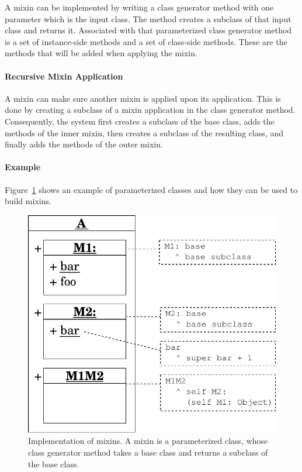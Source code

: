 A mixin can be implemented by writing a class generator method with one parameter which is the input class. The method creates a subclass of that input class and returns it. Associated with that parameterized class generator method is a set of instance-side methods and a set of class-side methods. These are the methods that will be added when applying the mixin.

\paragraph{Recursive Mixin Application}
A mixin can make sure another mixin is applied upon its application. This is done by creating a subclass of a mixin application in the class generator method. Consequently, the system first creates a subclass of the base class, adds the methods of the inner mixin, then creates a subclass of the resulting class, and finally adds the methods of the outer mixin.

\paragraph{Example}
Figure~\ref{fig:concept_mixins} shows an example of parameterized classes and how they can be used to build mixins.

\begin{figure}[!htp]
    \centering
    \includegraphics[scale=0.75]{nested_mixins.pdf}
    \caption[Implementation of mixins]{Implementation of mixins. A mixin is a parameterized class, whose class generator method takes a base class and returns a subclass of the base class.}
    \label{fig:concept_mixins}
\end{figure}

